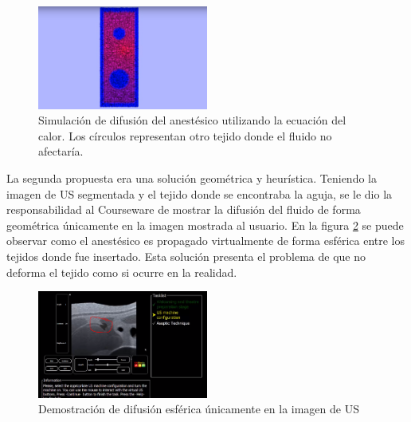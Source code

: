 \begin{figure}[h]
    \centering
    \includegraphics[width=0.5\textwidth]{IMG/spread.PNG}
    \caption{Simulación de difusión del anestésico utilizando la ecuación del calor. Los círculos representan otro tejido donde el fluido no afectaría.}
    \label{fig:spread}
\end{figure}

La segunda propuesta era una solución geométrica y heurística. Teniendo la imagen de \ac{US} segmentada y el tejido donde se encontraba la aguja, se le dio la responsabilidad al \ac{Courseware} de mostrar la difusión del fluido de forma geométrica únicamente en la imagen mostrada al usuario. En la figura \ref{fig:spread2} se puede observar como el anestésico es propagado virtualmente de forma esférica entre los tejidos donde fue insertado. Esta solución presenta el problema de que no deforma el tejido como si ocurre en la realidad.

\begin{figure}[h]
    \centering
    \includegraphics[width=0.5\textwidth]{IMG/spread2.PNG}
    \caption{Demostración de difusión esférica únicamente en la imagen de \ac{US}}
    \label{fig:spread2}
\end{figure}


